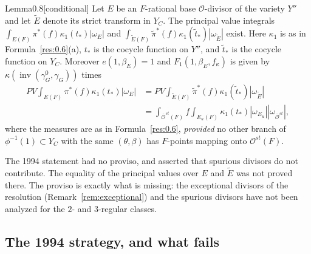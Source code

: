 \documentclass[12pt,letterpaper]{amsart}
\theoremstyle{plain}
\theoremstyle{definition}
\theoremstyle{remark}
\theoremstyle{definition}
\DeclareMathOperator{\inv}{inv}
\begin{document}
\begin{res}{Lemma}{0.8}[conditional]\label{res:0.8}
Let $E$ be an $F$-rational
base ${\mathcal O}$-divisor of the
variety $Y''$ and let $\tilde{E}$ denote its strict transform
in $Y_C$. The principal
value integrals $\int_{{E}(F)}\pi^*(f)\kappa_1(t_*) |\omega_{{E}}|$ and
$\int_{\tilde{E}(F)}\tilde{\pi}^*(f)\kappa_1(\tilde{t}_*) |\omega_{\tilde{E}}|$
exist. Here $\kappa_1$ is as in Formula~\ref{res:0.6}(a), $t_*$ is the
cocycle function on $Y''$, and $\tilde{t}_*$ is the cocycle function
on $Y_C$. Moreover $e(1,\beta_E)=1$ and
$F_1(1,\beta_E,f_\kappa)$ is given
by $\kappa(\inv(\gamma_G^0,\gamma_G))$ times
\[
\begin{split}
PV\int_{{E}(F)}\pi^*(f)\kappa_1(t_*) |\omega_{{E}}|
&=PV\int_{\tilde{E}(F)}\tilde{\pi}^*(f)
\kappa_1(\tilde{t}_*) |\omega_{\tilde{E}}|\\
&=\int_{\overline{\mathcal O}^{st}(F)}
f\int_{{E}_u(F)}\kappa_1(t_*)|\omega_{{E}_u}|
|\omega_{\overline{\mathcal O}^{st}}|,
\end{split}
\]
where the measures are as in Formula~\ref{res:0.6}, \emph{provided} no other
branch of $\phi^{-1}(1)\subset Y_C$ with the same $(\theta,\beta)$ has
$F$-points mapping onto ${\mathcal O}^{st}(F)$.
\end{res}

\begin{rem26}\label{rem:0.8}
The 1994 statement had no proviso, and asserted that spurious divisors do not
contribute. The equality of the principal values over $E$ and $\tilde E$ was
not proved there. The proviso is exactly what is missing: the exceptional
divisors of the resolution (Remark~\ref{rem:exceptional}) and the spurious
divisors have not been analyzed for the $2$- and $3$-regular classes.
\end{rem26}

\subsection*{The 1994 strategy, and what fails}
\end{document}
